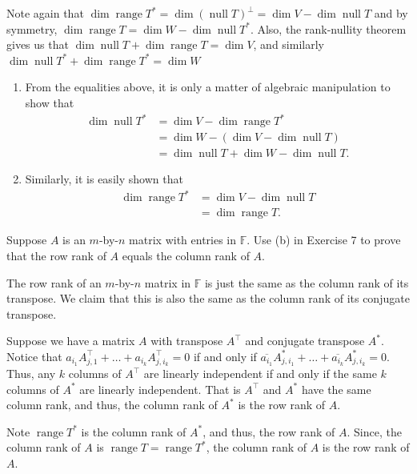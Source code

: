 \documentclass[12 pt, letterpaper]{hmcpset}
\begin{document}
\begin{solution}
	Note again that $\dim \operatorname{range} T^{*} = \dim (\operatorname{null} T)^{\perp} = \dim V - \dim \operatorname{null} T$ and by symmetry, $\dim \operatorname{range} T = \dim W - \dim \operatorname{null} T^{*}$. Also, the rank-nullity theorem gives us that $\dim \operatorname{null} T + \dim \operatorname{range} T = \dim V$, and similarly $\dim \operatorname{null} T^{*} + \dim \operatorname{range} T^{*} = \dim W$
	\begin{enumerate}
		\item From the equalities above, it is only a matter of algebraic manipulation to show that
			\[
				\begin{split}
					\dim \operatorname{null} T^{*} & = \dim V - \dim \operatorname{range} T^{*} \\
								       & = \dim W - (\dim V - \dim \operatorname{null} T) \\
								       & = \dim \operatorname{null} T + \dim W - \dim \operatorname{null} T.
				\end{split}
			\]
		\item Similarly, it is easily shown that
			\[
				\begin{split}
					\dim \operatorname{range} T^{*} & = \dim V - \dim \operatorname{null} T \\
									& = \dim \operatorname{range} T.
				\end{split}
			\]
	\end{enumerate}
\end{solution}

\pagebreak

\begin{problem}[8]
	Suppose $A$ is an $m$-by-$n$ matrix with entries in $\mathbb{F}$. Use (b) in Exercise 7 to prove that the row rank of $A$ equals the column rank of $A$.
\end{problem}

\begin{solution}
	The row rank of an $m$-by-$n$ matrix in $\mathbb{F}$ is just the same as the column rank of its transpose. We claim that this is also the same as the column rank of its conjugate transpose.

	Suppose we have a matrix $A$ with transpose $A^{\top}$ and conjugate transpose $A^{*}$. Notice that $a_{i_{1}} A^{\top}_{j, 1} + \dots + a_{i_{k}} A^{\top}_{j, i_{k}} = 0$ if and only if $\overline{a_{i_{1}}} A^{*}_{j, i_{1}} + \dots + \overline{a_{i_{k}}} A^{*}_{j, i_{k}} = 0$. Thus, any $k$ columns of  $A^{\top}$ are linearly independent if and only if the same $k$ columns of  $A^{*}$ are linearly independent. That is $A^{\top}$ and $A^{*}$ have the same column rank, and thus, the column rank of $A^{*}$ is the row rank of $A$.

	Note $\operatorname{range} T^{*}$ is the column rank of $A^{*}$, and thus, the row rank of $A$. Since, the column rank of $A$ is $\operatorname{range} T = \operatorname{range} T^{*}$, the column rank of $A$ is the row rank of $A$.
\end{solution}
\end{document}
